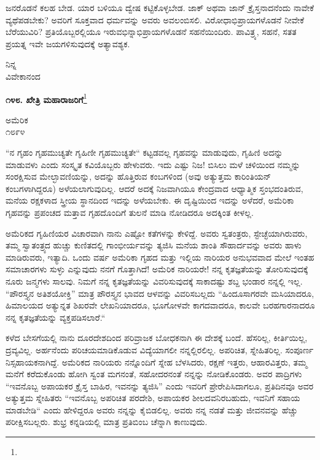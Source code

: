ಜನರೊಡನೆ ಕಲಹ ಬೇಡ. ಯಾರ ಬಳಿಯೂ ದ್ವೇಷ ಕಟ್ಟಿಕೊಳ್ಳಬೇಡ. ಜಾಕ್ ಅಥವಾ ಜಾನ್ ಕ್ರೈಸ್ತನಾದನೆಂದು ನಾವೇಕೆ ವ್ಯಥೆಪಡಬೇಕು? ಅವರಿಗೆ ಸೂಕ್ತವಾದ ಧರ್ಮವನ್ನು ಅವರು ಅವಲಂಬಿಸಲಿ. ವಿರೋಧಾಭಿಪ್ರಾಯಗಳೊಡನೆ ನೀವೇಕೆ ಬೆರೆಯುವಿರಿ? ಪ್ರತಿಯೊಬ್ಬರಲ್ಲಿಯೂ ಇರುವಭಿನ್ನಾಭಿಪ್ರಾಯಗಳೊಡನೆ ಸಹನೆಯಿಂದಿರು. ಪಾವಿತ್ರ್ಯ, ಸಹನೆ, ಸತತ ಪ್ರಯತ್ನ ಇವೇ ಜಯಗಳಿಸುವುದಕ್ಕೆ ಅತ್ಯಾವಶ್ಯಕ.
{\flushright
ನಿನ್ನ\\ವಿವೇಕಾನಂದ\par}

\begin{center}
\textbf{೧೪೮. ಖೇತ್ರಿ ಮಹಾರಾಜರಿಗೆ}\footnote{}
\end{center}

\vspace{-0.6cm}

\begin{flushright}
ಅಮೆರಿಕ\\೧೮೯೪
\end{flushright}

“ನ ಗೃಹಂ ಗೃಹಮುಚ್ಯತೇ ಗೃಹಿಣೀ ಗೃಹಮುಚ್ಯತೇ“ ಕಟ್ಟಡವಲ್ಲ ಗೃಹವನ್ನು ಮಾಡುವುದು, ಗೃಹಿಣಿ ಅದನ್ನು ಮಾಡುವಳು ಎಂದು ಸಂಸ್ಕೃತ ಕವಿಯೊಬ್ಬರು ಹೇಳುವರು. ಇದು ಎಷ್ಟು ನಿಜ! ಬಿಸಿಲು ಮಳೆ ಚಳಿಯಿಂದ ನಮ್ಮನ್ನು ಸಂರಕ್ಷಿಸುವ ಮೇಲ್ಛಾವಣಿಯನ್ನು, ಅದನ್ನು ಹೊತ್ತಿರುವ ಕಂಬಗಳಿಂದ (ಅವು ಅತ್ಯುತ್ತಮ ಕಾರಿಂತಿಯನ್‌ ಕಂಬಗಳಾಗಿದ್ದರೂ) ಅಳೆಯಲಾಗುವುದಿಲ್ಲ. ಆದರೆ ಅದಕ್ಕೆ ನಿಜವಾಗಿಯೂ ಕೇಂದ್ರವಾದ ಆಧ್ಯಾತ್ಮಿಕ ಸ್ತಂಭದಂತಿರುವ, ಮನೆಯ ರಕ್ಷಕಳಾದ ಸ್ತ್ರೀಯ ಸ್ಥಾನದಿಂದ ಇದನ್ನು ಅಳೆಯಬೇಕು. ಈ ದೃಷ್ಟಿಯಿಂದ ಇದನ್ನು ಅಳೆದರೆ, ಅಮೆರಿಕಾ ಗೃಹವನ್ನು ಪ್ರಪಂಚದ ಮತ್ತಾವ ಗೃಹದೊಂದಿಗೆ ತುಲನೆ ಮಾಡಿ ನೋಡಿದರೂ ಅದಕ್ಕಿಂತ ಕೀಳಲ್ಲ.
\vspace{0.5cm}

ಅಮೆರಿಕದ ಗೃಹಿಣಿಯರ ವಿಚಾರವಾಗಿ ನಾನು ಎಷ್ಟೋ ಕತೆಗಳನ್ನು ಕೇಳಿದ್ದೆ. ಅವರು ಸ್ವತಂತ್ರರು, ಸ್ಟೇಚ್ಛೆಯಾಗಿರುವರು, ತಮ್ಮ ಸ್ವಾತಂತ್ರ್ಯದ ಹುಚ್ಚು ಕುಣಿತದಲ್ಲಿ ಗಾಂಭೀರ್ಯವನ್ನು ತ್ಯಜಿಸಿ ಮನೆಯ ಶಾಂತಿ ಸೌಹಾರ್ದವನ್ನು ಅವರು ಹಾಳು ಮಾಡಿರುವರು, ಇತ್ಯಾದಿ. ಒಂದು ವರ್ಷ ಅಮೆರಿಕಾ ಗೃಹದ ಮತ್ತು ಇಲ್ಲಿಯ ನಾರಿಯರ ಅನುಭವವಾದ ಮೇಲೆ ಇಂತಹ ಸಮಾಚಾರಗಳು ಸುಳ್ಳು ಎನ್ನುವುದು ನನಗೆ ಗೊತ್ತಾಗಿದೆ! ಅಮೆರಿಕ ನಾರಿಯರೇ! ನನ್ನ ಕೃತಜ್ಞತೆಯನ್ನು ತೋರಿಸುವುದಕ್ಕೆ ನೂರು ಜನ್ಮಗಳು ಸಾಲವು. ನಿಮಗೆ ನನ್ನ ಕೃತಜ್ಞತೆಯನ್ನು ವಿವರಿಸುವುದಕ್ಕೆ ಸಾಕಾದಷ್ಟು ಶಬ್ದ ಭಂಡಾರ ನನ್ನಲ್ಲಿ ಇಲ್ಲ. “ಪೌರಸ್ತ್ಯನ ಅತಿಶಯೋಕ್ತಿ” ಮಾತ್ರ ಪೌರಸ್ತ್ಯನ ಭಾವದ ಆಳವನ್ನು ವಿವರಿಸಬಲ್ಲದು\enginline{-} “ಹಿಂದೂಸಾಗರವೇ ಮಸಿಯಾದರೂ, ಹಿಮಾಲಯದ ಅತ್ಯುನ್ನತ ಶಿಖರವೇ ಲೇಖನಿಯಾದರೂ, ಭೂಗೋಳವೇ ಕಾಗದವಾದರೂ, ಕಾಲವೇ ಬರಹಗಾರನಾದರೂ ನನ್ನ ಕೃತಜ್ಞತೆಯನ್ನು ವ್ಯಕ್ತಪಡಿಸಲಾರೆ.“
\vspace{0.5cm}

ಕಳೆದ ಬೇಸಗೆಯಲ್ಲಿ ನಾನು ದೂರದೇಶದಿಂದ ಪರಿವ್ರಾಜಕ ಬೋಧಕನಾಗಿ ಈ ದೇಶಕ್ಕೆ ಬಂದೆ. ಹೆಸರಿಲ್ಲ, ಕೀರ್ತಿಯಿಲ್ಲ, ದ್ರವ್ಯವಿಲ್ಲ. ಅರ್ಹನೆಂದು ಪರಿಚಯಮಾಡಿಕೊಡುವ ವಿದ್ಯೆಯಾಗಲೀ ನನ್ನಲ್ಲಿರಲಿಲ್ಲ. ಅಪರಿಚಿತ, ಸ್ನೇಹಿತರಿಲ್ಲ. ಸಂಪೂರ್ಣ ನಿಸ್ಸಹಾಯಕನಾಗಿದ್ದೆ. ಅಮೆರಿಕದ ನಾರಿಯರು ನನ್ನೊಂದಿಗೆ ಸ್ನೇಹ ಬೆಳಸಿದರು, ರಕ್ಷಣೆ ಇತ್ತರು, ಆಹಾರವಿತ್ತರು, ತಮ್ಮ ಮನೆಗೆ ಕರೆದುಕೊಂಡು ಹೋಗಿ ಸ್ವಂತ ಮಗನಂತೆ, ಸಹೋದರನಂತೆ ನನ್ನನ್ನು ನೋಡಿಕೊಂಡರು. ಅವರ ಪಾದ್ರಿಗಳು “ಇವನೊಬ್ಬ ಅಪಾಯಕರ ಕ್ರೈಸ್ತ ಬಾಹಿರ, ಇವನನ್ನು ತ್ಯಜಿಸಿ” ಎಂದು ಇವರಿಗೆ ಪ್ರೇರೇಪಿಸಿದಾಗಲೂ, ಪ್ರತಿದಿನವೂ ಅವರ ಅತ್ಯುತ್ತಮ ಸ್ನೇಹಿತರು “ಇವನೊಬ್ಬ ಅಪರಿಚಿತ ಪರದೇಶಿ, ಅಪಾಯಕರ ಶೀಲದವನಿರಬಹುದು, ಇವನಿಗೆ ಸಹಾಯ ಮಾಡಬೇಡಿ“ ಎಂದು ಹೇಳಿದ್ದರೂ ಅವರು ನನ್ನನ್ನು ಕೈಬಿಡಲಿಲ್ಲ. ಅವರು ನನ್ನ ನಡತೆ ಮತ್ತು ಜೀವನವನ್ನು ಹೆಚ್ಚು ಪರೀಕ್ಷಿಸಬಲ್ಲರು. ಶುಭ್ರ ಕನ್ನಡಿಯಲ್ಲಿ ಮಾತ್ರ ಪ್ರತಿಬಿಂಬ ಚೆನ್ನಾಗಿ ಕಾಣುವುದು.

